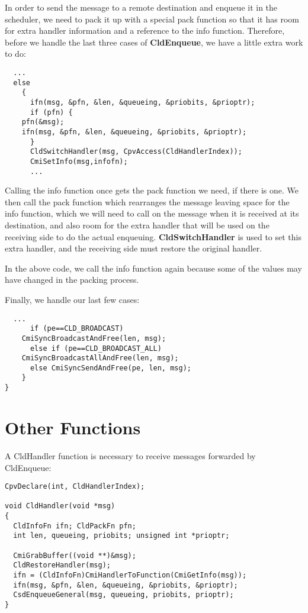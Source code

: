 In order to send the message to a remote destination and enqueue it in
the scheduler, we need to pack it up with a special pack function so
that it has room for extra handler information and a reference to the
info function.  Therefore, before we handle the last three cases of
{\bf CldEnqueue}, we have a little extra work to do:

\begin{verbatim}
  ...
  else
    {
      ifn(msg, &pfn, &len, &queueing, &priobits, &prioptr);
      if (pfn) {
	pfn(&msg);
	ifn(msg, &pfn, &len, &queueing, &priobits, &prioptr);
      }
      CldSwitchHandler(msg, CpvAccess(CldHandlerIndex));
      CmiSetInfo(msg,infofn);
      ...
\end{verbatim}

Calling the info function once gets the pack function we need, if
there is one.  We then call the pack function which rearranges the
message leaving space for the info function, which we will need to
call on the message when it is received at its destination, and also
room for the extra handler that will be used on the receiving side to
do the actual enqueuing.  {\bf CldSwitchHandler} is used to set this extra
handler, and the receiving side must restore the original handler.

In the above code, we call the info function again because some of the
values may have changed in the packing process.  

Finally, we handle our last few cases:

\begin{verbatim}
  ...
      if (pe==CLD_BROADCAST) 
	CmiSyncBroadcastAndFree(len, msg);
      else if (pe==CLD_BROADCAST_ALL)
	CmiSyncBroadcastAllAndFree(len, msg);
      else CmiSyncSendAndFree(pe, len, msg);
    }
}
\end{verbatim}

\section{Other Functions}

A CldHandler function is necessary to receive messages forwarded by
CldEnqueue:

\begin{verbatim}
CpvDeclare(int, CldHandlerIndex);

void CldHandler(void *msg)
{
  CldInfoFn ifn; CldPackFn pfn;
  int len, queueing, priobits; unsigned int *prioptr;
  
  CmiGrabBuffer((void **)&msg);
  CldRestoreHandler(msg);
  ifn = (CldInfoFn)CmiHandlerToFunction(CmiGetInfo(msg));
  ifn(msg, &pfn, &len, &queueing, &priobits, &prioptr);
  CsdEnqueueGeneral(msg, queueing, priobits, prioptr);
}
\end{verbatim}

